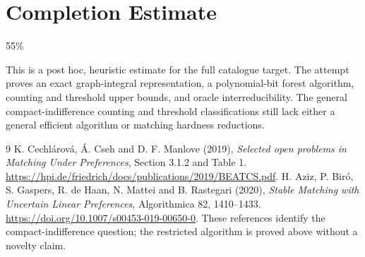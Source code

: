 \documentclass[11pt,a4paper]{article}
\begin{document}
\section{Completion Estimate}
55\%

This is a post hoc, heuristic estimate for the full catalogue target.
The attempt proves an exact graph-integral representation, a polynomial-bit forest algorithm, counting and threshold upper bounds, and oracle interreducibility. The general compact-indifference counting and threshold classifications still lack either a general efficient algorithm or matching hardness reductions.

\begin{thebibliography}{9}
 K. Cechl\'arov\'a, \'A. Cseh and D. F. Manlove (2019), \emph{Selected open problems in Matching Under Preferences}, Section 3.1.2 and Table 1. \url{https://hpi.de/friedrich/docs/publications/2019/BEATCS.pdf}.
 H. Aziz, P. Bir\'o, S. Gaspers, R. de Haan, N. Mattei and B. Rastegari (2020), \emph{Stable Matching with Uncertain Linear Preferences}, Algorithmica 82, 1410--1433. \url{https://doi.org/10.1007/s00453-019-00650-0}. These references identify the compact-indifference question; the restricted algorithm is proved above without a novelty claim.
\end{thebibliography}
\end{document}
